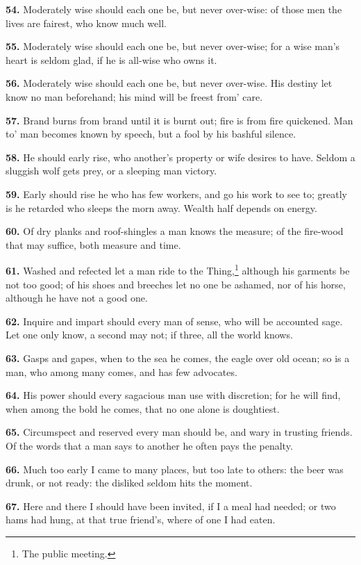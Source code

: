 \textbf{54.} Moderately wise should each one be, but never over-wise: of
those men the lives are fairest, who know much well.

\textbf{55.} Moderately wise should each one be, but never over-wise; for a
wise man's heart is seldom glad, if he is all-wise who owns it.

\textbf{56.} Moderately wise should each one be, but never over-wise. His
destiny let know no man beforehand; his mind will be freest from'
care.

\textbf{57.} Brand burns from brand until it is burnt out; fire is from fire
quickened. Man to' man becomes known by speech, but a fool by his
bashful silence.

\textbf{58.} He should early rise, who another's property or wife desires to
have. Seldom a sluggish wolf gets prey, or a sleeping man victory.

\textbf{59.} Early should rise he who has few workers, and go his work to see
to; greatly is he retarded who sleeps the morn away. Wealth half
depends on energy.

\textbf{60.} Of dry planks and roof-shingles a man knows the measure; of the
fire-wood that may suffice, both measure and time.

\textbf{61.} Washed and refected let a man ride to the Thing,\footnote{The public meeting.} although
his garments be not too good; of his shoes and breeches let no one be
ashamed, nor of his horse, although he have not a good one.

\textbf{62.} Inquire and impart should every man of sense, who will be
accounted sage. Let one only know, a second may not; if three, all the
world knows.

\textbf{63.} Gasps and gapes, when to the sea he comes, the eagle over old
ocean; so is a man, who among many comes, and has few advocates.

\textbf{64.} His power should every sagacious man use with discretion; for he
will find, when among the bold he comes, that no one alone is
doughtiest.

\textbf{65.} Circumspect and reserved every man should be, and wary in
trusting friends. Of the words that a man says to another he often
pays the penalty.

\textbf{66.} Much too early I came to many places, but too late to others:
the beer was drunk, or not ready: the disliked seldom hits the moment.

\textbf{67.} Here and there I should have been invited, if I a meal had
needed; or two hams had hung, at that true friend's, where of one I
had eaten.

